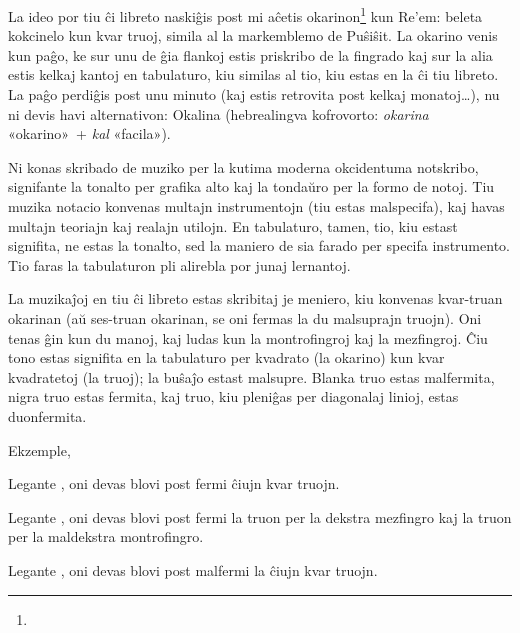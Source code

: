
La ideo por tiu ĉi libreto naskiĝis post mi aĉetis okarinon\footnote{} kun Re’em: beleta kokcinelo kun kvar truoj, simila al la markemblemo de Puŝiŝit. La okarino venis kun paĝo, ke sur unu de ĝia flankoj estis priskribo de la fingrado kaj sur la alia estis kelkaj kantoj en tabulaturo, kiu similas al tio, kiu estas en la ĉi tiu libreto. La paĝo perdiĝis post unu minuto (kaj estis retrovita post kelkaj monatoj…), nu ni devis havi alternativon: Okalina (hebrealingva kofrovorto: \emph{okarina} «okarino»~+ \emph{kal} «facila»).



Ni konas skribado de muziko per la kutima moderna okcidentuma notskribo, signifante la tonalto per grafika alto kaj la tondaŭro per la formo de notoj. Tiu muzika notacio konvenas multajn instrumentojn (tiu estas malspecifa), kaj havas multajn teoriajn kaj realajn utilojn. En tabulaturo, tamen, tio, kiu estast signifita, ne estas la tonalto, sed la maniero de sia farado per specifa instrumento. Tio faras la tabulaturon pli alirebla por junaj lernantoj.

La muzikaĵoj en tiu ĉi libreto estas skribitaj je meniero, kiu konvenas kvar-truan okarinan (aŭ ses-truan okarinan, se oni fermas la du malsuprajn truojn). Oni tenas ĝin kun du manoj, kaj ludas kun la montrofingroj kaj la mezfingroj. Ĉiu tono estas signifita en la tabulaturo per kvadrato (la okarino) kun kvar kvadratetoj (la truoj); la buŝaĵo estast malsupre. Blanka truo estas malfermita, nigra truo estas fermita, kaj truo, kiu pleniĝas per diagonalaj linioj, estas duonfermita.

Ekzemple,
\begin{compactitem}
	\item Legante \enliniatabulaturo{\c}, oni devas blovi post fermi ĉiujn kvar truojn.
	\item Legante \enliniatabulaturo{\gis}, oni devas blovi post fermi la truon per la dekstra mezfingro kaj la truon per la maldekstra montrofingro.
	\item Legante \enliniatabulaturo{\C}, oni devas blovi post malfermi la ĉiujn kvar truojn.
\end{compactitem}

